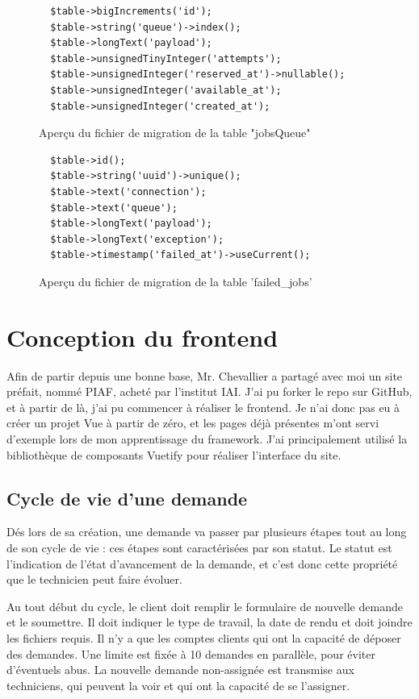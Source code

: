 \documentclass[
    iai, %
    eai, %
]{heig-tb}
\begin{document}
\begin{figure}[h]
  \begin{verbatim}
  $table->bigIncrements('id');
  $table->string('queue')->index();
  $table->longText('payload');
  $table->unsignedTinyInteger('attempts');
  $table->unsignedInteger('reserved_at')->nullable();
  $table->unsignedInteger('available_at');
  $table->unsignedInteger('created_at');
  \end{verbatim}
  \caption{Aperçu du fichier de migration de la table "jobsQueue"}
\end{figure}

\begin{figure}[h]
  \begin{verbatim}
  $table->id();
  $table->string('uuid')->unique();
  $table->text('connection');
  $table->text('queue');
  $table->longText('payload');
  $table->longText('exception');
  $table->timestamp('failed_at')->useCurrent();
  \end{verbatim}
  \caption{Aperçu du fichier de migration de la table 'failed\_jobs'}
\end{figure}

\chapter{Conception du frontend}
Afin de partir depuis une bonne base, Mr. Chevallier a partagé avec moi un site préfait, nommé PIAF, acheté par l'institut IAI.
J'ai pu forker le repo sur GitHub, et à partir de là, j'ai pu commencer à réaliser le frontend. Je n'ai donc pas eu à créer un projet Vue à partir de zéro, et les pages déjà présentes m'ont servi d'exemple lors de mon apprentissage du framework. J'ai principalement utilisé la bibliothèque de composants Vuetify pour réaliser l'interface du site.

\section{Cycle de vie d'une demande}
Dés lors de sa création, une demande va passer par plusieurs étapes tout au long de son cycle de vie : ces étapes sont caractérisées par son statut.
Le statut est l'indication de l'état d'avancement de la demande, et c'est donc cette propriété que le technicien peut faire évoluer.

Au tout début du cycle, le client doit remplir le formulaire de nouvelle demande et le soumettre. Il doit indiquer le type de travail, la date de rendu et doit joindre les fichiers requis.
Il n'y a que les comptes clients qui ont la capacité de déposer des demandes. Une limite est fixée à 10 demandes en parallèle, pour éviter d'éventuels abus.
La nouvelle demande non-assignée est transmise aux techniciens, qui peuvent la voir et qui ont la capacité de se l'assigner.
\end{document}
